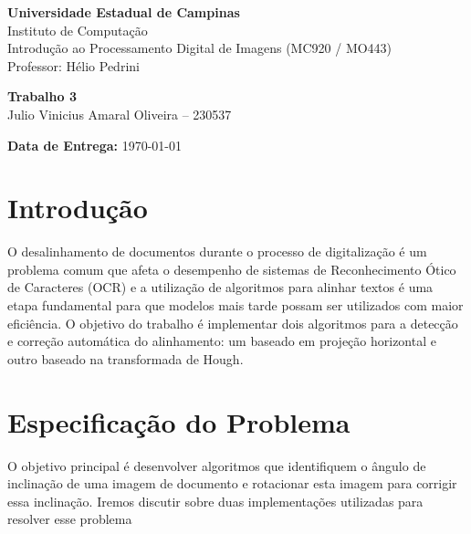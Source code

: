 \documentclass{article}
\begin{document}
\begin{center}
    \Large \textbf{Universidade Estadual de Campinas} \\
    \large Instituto de Computação \\
    \vspace{0.5cm}
    \large Introdução ao Processamento Digital de Imagens (MC920 / MO443) \\
    \large Professor: Hélio Pedrini
\end{center}

\vspace{2cm}

\begin{center}
    \LARGE \textbf{Trabalho 3} \\
    \vspace{0.5cm}
    \Large Julio Vinicius Amaral Oliveira – 230537
\end{center}

\vspace{2cm}

\begin{flushright}
    \large \textbf{Data de Entrega:} \today 
\end{flushright}

\newpage


\begin{abstract}
O objetivo deste relatório é mostrar a utilização de 2 algoritmos para o alinhamento de imagens, utilizamos o algoritmo de projeção horizontal e a transformada de Hough. Neste relatório, iremos detalhar o métodos, escolhas realizadas, testes e resultadoss
\end{abstract}

\section{Introdução}
O desalinhamento de documentos durante o processo de digitalização é um problema comum que afeta o desempenho de sistemas de Reconhecimento Ótico de Caracteres (OCR) e a utilização de algoritmos para alinhar textos é uma etapa fundamental para que modelos mais tarde possam ser utilizados com maior eficiência. O objetivo do trabalho é implementar dois algoritmos para a detecção e correção automática do alinhamento: um baseado em projeção horizontal e outro baseado na transformada de Hough.

\section{Especificação do Problema}
O objetivo principal é desenvolver algoritmos que identifiquem o ângulo de inclinação de uma imagem de documento e rotacionar esta imagem para corrigir essa inclinação. Iremos discutir sobre duas implementações utilizadas para resolver esse problema
\end{document}
